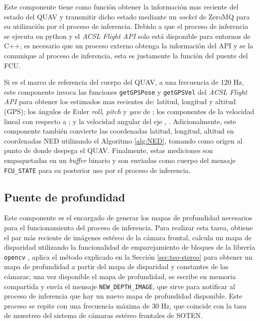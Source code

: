 Este componente tiene como función obtener la información mas reciente del estado del QUAV y transmitir dicho estado mediante un \textit{socket} de ZeroMQ para su utilización por el proceso de inferencia. Debido a que el proceso de inferencia se ejecuta en python y el \textit{ACSL Flight API} solo está disponible para entornos de C++, es necesario que un proceso externo obtenga la información del API y se la comunique al proceso de inferencia, esta es justamente la función del puente del FCU.

Si  es el marco de referencia del cuerpo del QUAV, a una frecuencia de 120 Hz, este componente invoca las funciones \texttt{getGPSPose} y \texttt{getGPSVel} del \textit{ACSL Flight API} para obtener los estimados mas recientes de: latitud, longitud y altitud (GPS); los ángulos de Euler \textit{roll}, \textit{pitch} y \textit{yaw} de ; los componentes  de la velocidad lineal con respecto a ; y la velocidad angular del eje , . Adicionalmente, este componente también convierte las coordenadas latitud, longitud, altitud en coordenadas NED utilizando el Algoritmo \ref{alg:NED}, tomando como origen al punto de donde despega el QUAV. Finalmente, estas mediciones son empaquetadas en un \textit{buffer} binario y son enviadas como cuerpo del mensaje \texttt{FCU\_STATE} para su posterior uso por el proceso de inferencia.


\subsection{Puente de profundidad}

Este componente es el encargado de generar los mapas de profundidad necesarios para el funcionamiento del proceso de inferencia. Para realizar esta tarea, obtiene el par más reciente de imágenes estéreo de la cámara frontal, calcula un mapa de disparidad utilizando la funcionalidad de emparejamiento de bloques de la librería \texttt{opencv} \cite{bradski2000opencv}, aplica el método explicado en la Sección \ref{sec:teo-stereo} para obtener un mapa de profundidad a partir del mapa de disparidad y constantes de las cámaras; una vez disponible el mapa de profundidad, se escribe en memoria compartida y envía el mensaje \texttt{NEW\_DEPTH\_IMAGE}, que sirve para notificar al proceso de inferencia que hay un nuevo mapa de profundidad disponible. Este proceso se repite con una frecuencia máxima de 30 Hz, que coincide con la tasa de muestreo del sistema de cámaras estéreo frontales de SOTEN.

